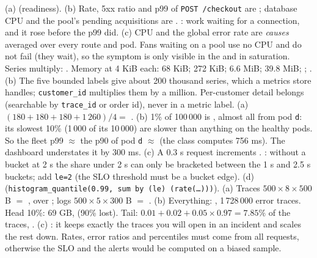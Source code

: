  (a)  (readiness). (b) Rate, 5xx ratio and p99 of \texttt{POST /checkout} are ; database CPU and the pool's pending acquisitions are . : work waiting for a connection, and it rose before the p99 did. (c) CPU and the global error rate are \emph{causes} averaged over every route and pod. Fans waiting on a pool use no CPU and do not fail (they wait), so the symptom is only visible in the  and in saturation.
 Series multiply: . Memory at 4 KiB each: 68 KiB; 272 KiB; 6.6 MiB; 39.8 MiB; ; . (b) The five bounded labels give about 200 thousand series, which a metrics store handles; \texttt{customer\_id} multiplies them by a million. Per-customer detail belongs  (searchable by \texttt{trace\_id} or order id), never in a metric label.
 (a) $(180 + 180 + 180 + 1\,260)/4 =$ . (b) 1\% of 100\,000 is , almost all from pod \texttt{d}: its slowest 10\% (1\,000 of its 10\,000) are slower than anything on the healthy pods. So the fleet p99 $\approx$ the p90 of pod \texttt{d} $\approx$  (the class computes 756 ms). The dashboard understates it by 300 ms. (c) A 0.3 s request increments . : without a bucket at 2 s the share under 2 s can only be bracketed between the 1 s and 2.5 s buckets; add \texttt{le=2} (the SLO threshold must be a bucket edge). (d)  (\texttt{histogram\_quantile(0.99, sum by (le) (rate(\dots)))}).
 (a) Traces $500 \times 8 \times 500$ B $=$ , over ; logs $500 \times 5 \times 300$ B $=$ . (b) Everything: , 1\,728\,000 error traces. Head 10\%: 69 GB,  (90\% lost). Tail: $0.01 + 0.02 + 0.05 \times 0.97 = 7.85\%$ of the traces, . (c) : it keeps exactly the traces you will open in an incident and scales the rest down. Rates, error ratios and percentiles must come from all requests, otherwise the SLO and the alerts would be computed on a biased sample.
